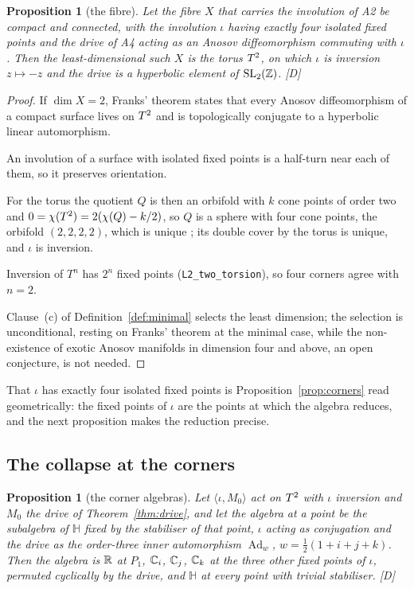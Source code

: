 \documentclass[11pt,a4paper]{article}
\theoremstyle{plain}
\newtheorem{proposition}[theorem]{Proposition}
\theoremstyle{definition}
\theoremstyle{remark}
\newcommand{\Hquat}{\mathbb{H}}
\newcommand{\Ad}{\operatorname{Ad}}
\newcommand{\rigD}{[\textup{D}]}
\begin{document}
\begin{proposition}[the fibre]\label{prop:surface}
Let the fibre $X$ that carries the involution of A2 be compact and connected, with the involution $\iota$ having exactly four isolated fixed points and the drive of A4 acting as an Anosov diffeomorphism commuting with $\iota$. Then the least-dimensional such $X$ is the torus $T^2$, on which $\iota$ is inversion $z\mapsto-z$ and the drive is a hyperbolic element of $\mathrm{SL}_{2}(\mathbb{Z})$. \rigD
\end{proposition}

\begin{proof}
If $\dim X=2$, Franks' theorem \cite{Franks1970} states that every Anosov diffeomorphism of a compact surface lives on $T^2$ and is topologically conjugate to a hyperbolic linear automorphism.

An involution of a surface with isolated fixed points is a half-turn near each of them, so it preserves orientation.

For the torus the quotient $Q$ is then an orbifold with $k$ cone points of order two and $0=\chi(T^2)=2(\chi(Q)-k/2)$, so $Q$ is a sphere with four cone points, the orbifold $(2,2,2,2)$, which is unique \cite{Thurston}; its double cover by the torus is unique, and $\iota$ is inversion.

Inversion of $T^{n}$ has $2^{n}$ fixed points (\texttt{L2\_two\_torsion}), so four corners agree with $n=2$.

Clause~(c) of Definition~\ref{def:minimal} selects the least dimension; the selection is unconditional, resting on Franks' theorem at the minimal case, while the non-existence of exotic Anosov manifolds in dimension four and above, an open conjecture, is not needed.
\end{proof}

That $\iota$ has exactly four isolated fixed points is Proposition~\ref{prop:corners} read geometrically: the fixed points of $\iota$ are the points at which the algebra reduces, and the next proposition makes the reduction precise.

\subsection{The collapse at the corners}

\begin{proposition}[the corner algebras]\label{prop:collapse}
Let $\langle\iota,M_{0}\rangle$ act on $T^2$ with $\iota$ inversion and $M_{0}$ the drive of Theorem~\ref{thm:drive}, and let the algebra at a point be the subalgebra of $\Hquat$ fixed by the stabiliser of that point, $\iota$ acting as conjugation and the drive as the order-three inner automorphism $\Ad_{w}$, $w=\tfrac12(1+i+j+k)$. Then the algebra is $\mathbb{R}$ at $P_{1}$, $\mathbb{C}_{i}$, $\mathbb{C}_{j}$, $\mathbb{C}_{k}$ at the three other fixed points of $\iota$, permuted cyclically by the drive, and $\Hquat$ at every point with trivial stabiliser. \rigD
\end{proposition}
\end{document}
